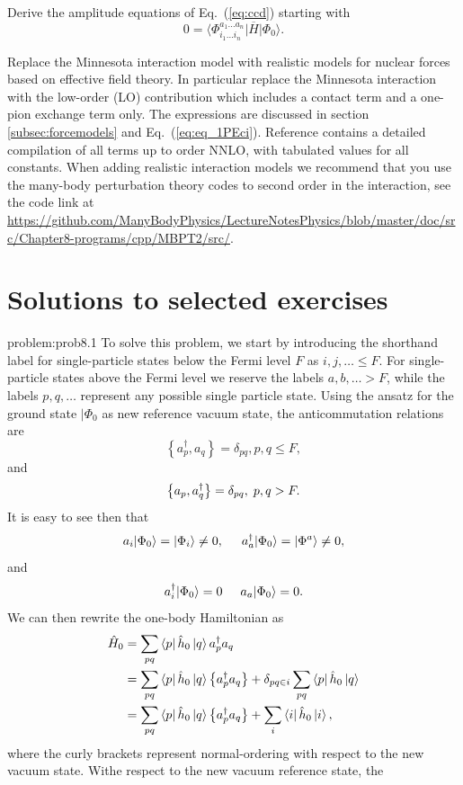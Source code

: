 \begin{prob} \label{problem:amplitudes}
Derive the amplitude equations of Eq.~(\ref{eq:ccd}) starting with 
 \[
          0 = \langle\Phi_{i_1 \ldots i_n}^{a_1 \ldots a_n}\vert
          \overline{H}\vert \Phi_0\rangle.
 \]
\end{prob}
  \begin{prob}\label{problem:realisticforces}
Replace the Minnesota interaction model with realistic models for nuclear forces based on effective field theory. In particular 
replace the Minnesota interaction with the low-order (LO) contribution which includes a contact term and a one-pion exchange
term only. The expressions are discussed in section  \ref{subsec:forcemodels} and Eq.~(\ref{eq:eq_1PEci}). Reference \cite{ekstromPRX} contains a
detailed compilation of all terms up to order NNLO, with tabulated values for all constants. 
When adding realistic interaction models we recommend that you use the many-body perturbation theory codes to second order in the interaction, see the code link at \url{https://github.com/ManyBodyPhysics/LectureNotesPhysics/blob/master/doc/src/Chapter8-programs/cpp/MBPT2/src/}. 
\end{prob}

  \section{Solutions to selected exercises}
  \begin{sol}{problem:prob8.1}
  To solve this problem, we start by introducing the shorthand label
  for single-particle states below the Fermi level $F$ as $i,j,\ldots
  \leq F$. For single-particle states above the Fermi level we reserve
  the labels $a,b,\ldots > F$, while the labels $p,q, \ldots$
  represent any possible single particle state.  Using the ansatz for
  the ground state $\vert \Phi_0$ as new reference vacuum state, the
  anticommutation relations are
  \[
  \left\{a_p^\dagger, a_q \right\}= \delta_{pq}, p, q \leq F,
  \]
  and
  \[
  \left\{a_p, a_q^\dagger \right\} = \delta_{pq}, \hspace{0.1cm} p, q
  > F.
  \]
  It is easy to see then that
  \[
          a_i|\Phi_0\rangle = |\Phi_i\rangle\ne 0, \hspace{0.5cm}
          a_a^\dagger|\Phi_0\rangle = |\Phi^a\rangle\ne 0,
  \]
  and
  \[
  a_i^\dagger|\Phi_0\rangle = 0 \hspace{0.5cm} a_a|\Phi_0\rangle = 0.
  \]
  We can then rewrite the one-body Hamiltonian as
   \begin{align*}
          \hat{H}_0 &= \sum_{pq} \bra{p}\hat{h}_0\ket{q} a^\dagger_p
          a_q \\ &= \sum_{pq} \bra{p}\hat{h}_0\ket{q}
          \left\{a^\dagger_p a_q\right\} + \delta_{pq\in i} \sum_{pq}
          \bra{p}\hat{h}_0\ket{q} \\ &= \sum_{pq}
          \bra{p}\hat{h}_0\ket{q} \left\{a^\dagger_p a_q\right\} +
          \sum_i \bra{i}\hat{h}_0\ket{i},
   \end{align*}
  where the curly brackets represent normal-ordering with respect to
  the new vacuum state. Withe respect to the new vacuum reference
  state, the
  \end{sol}

